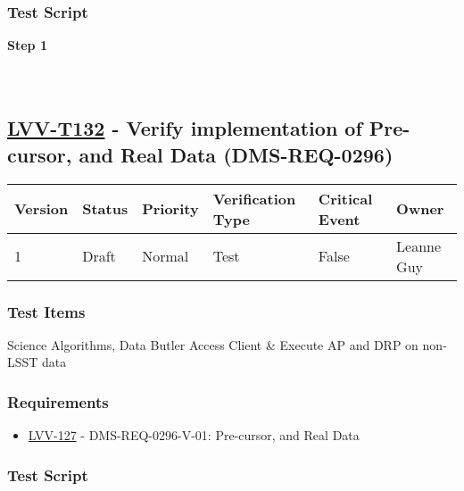 \hypertarget{test-script-108}{%
\subsubsection{Test Script}\label{test-script-108}}

\textbf{Step 1}\\
~\\
~\\

\hypertarget{lvv-t132---verify-implementation-of-pre-cursor-and-real-data-dms-req-0296}{%
\subsection{\texorpdfstring{\href{https://jira.lsstcorp.org/secure/Tests.jspa\#/testCase/LVV-T132}{LVV-T132}
- Verify implementation of Pre-cursor, and Real Data
(DMS-REQ-0296)}{LVV-T132 - Verify implementation of Pre-cursor, and Real Data (DMS-REQ-0296)}}\label{lvv-t132---verify-implementation-of-pre-cursor-and-real-data-dms-req-0296}}

\begin{longtable}[]{@{}llllll@{}}
\toprule
Version & Status & Priority & Verification Type & Critical Event &
Owner\tabularnewline
\midrule
\endhead
1 & Draft & Normal & Test & False & Leanne Guy\tabularnewline
\bottomrule
\end{longtable}

\hypertarget{test-items-108}{%
\subsubsection{Test Items}\label{test-items-108}}

Science Algorithms, Data Butler Access Client \& Execute AP and DRP on
non-LSST data

\hypertarget{requirements-109}{%
\subsubsection{Requirements}\label{requirements-109}}

\begin{itemize}
\tightlist
\item
  \href{https://jira.lsstcorp.org/browse/LVV-127}{LVV-127} -
  DMS-REQ-0296-V-01: Pre-cursor, and Real Data
\end{itemize}

\hypertarget{test-script-109}{%
\subsubsection{Test Script}\label{test-script-109}}

